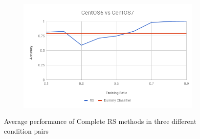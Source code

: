 \documentclass[10pt, conference, compsocconf]{IEEEtran}
\begin{document}
\begin{figure}[h!]
\begin{subfigure}[b]{0.8\linewidth}
                \includegraphics[width=\columnwidth]{figures/ALS/RS-ALS-6vs7-PFS}
        \end{subfigure}
        \caption{Average performance of Complete RS methods in three different condition pairs}
        \label{fig:RS method}
\end{figure}
\end{document}
